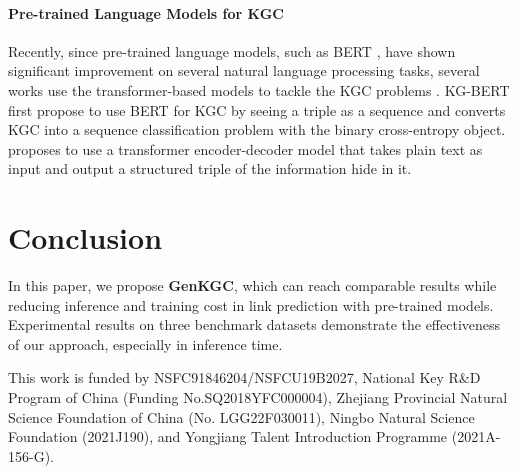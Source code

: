\documentclass[sigconf]{acmart}
\newcommand{\ours}{\textbf{GenKGC}}
\begin{document}
\paragraph{Pre-trained Language Models for KGC}
Recently, since pre-trained language models, such as BERT \cite{devlin2018bert}, have shown significant improvement on several natural language processing tasks, several works use the transformer-based models to tackle the KGC problems \cite{DBLP:journals/corr/abs-2201-05575,DBLP:journals/corr/abs-2201-11332,DBLP:journals/corr/abs-2201-11147}. 
KG-BERT \cite{kgbert} first propose to use BERT for KGC by seeing a triple as a sequence and converts KGC into a sequence classification problem with the binary cross-entropy object.
\cite{DBLP:journals/corr/abs-2112-08340} proposes to use a transformer encoder-decoder model that takes plain text as input and output a structured triple of the information hide in it.


\section{Conclusion}

In this paper, we propose \ours, which can reach comparable results while reducing inference and training cost in link prediction with pre-trained models.
Experimental results on three benchmark datasets demonstrate the effectiveness of our approach, especially in inference time. 



\begin{acks}
This work is funded by NSFC91846204/NSFCU19B2027, National Key R\&D Program of China (Funding No.SQ2018YFC000004), Zhejiang Provincial Natural Science Foundation of China  (No. LGG22F030011), Ningbo Natural Science Foundation (2021J190), and Yongjiang Talent Introduction Programme (2021A-156-G). 
\end{acks}




\appendix
\end{document}
